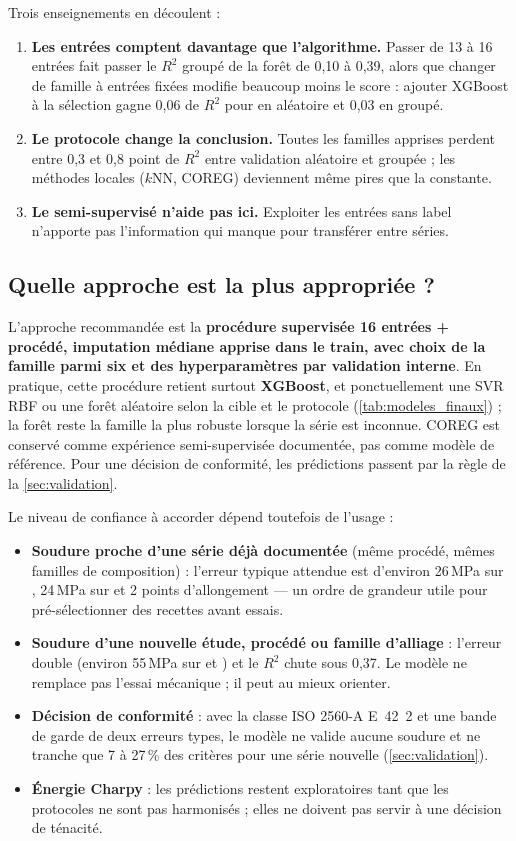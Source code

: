 Trois enseignements en découlent :
\begin{enumerate}
  \item \textbf{Les entrées comptent davantage que l'algorithme.} Passer de 13 à 16 entrées fait passer le $R^2$ groupé de la forêt de 0,10 à 0,39, alors que changer de famille à entrées fixées modifie beaucoup moins le score : ajouter XGBoost à la sélection gagne 0,06 de $R^2$ pour \YS{} en aléatoire et 0,03 en groupé.
  \item \textbf{Le protocole change la conclusion.} Toutes les familles apprises perdent entre 0,3 et 0,8 point de $R^2$ entre validation aléatoire et groupée ; les méthodes locales ($k$NN, COREG) deviennent même pires que la constante.
  \item \textbf{Le semi-supervisé n'aide pas ici.} Exploiter les entrées sans label n'apporte pas l'information qui manque pour transférer entre séries.
\end{enumerate}

\subsection{Quelle approche est la plus appropriée ?}

\begin{decision}
L'approche recommandée est la \textbf{procédure supervisée 16 entrées + procédé,
imputation médiane apprise dans le train, avec choix de la famille parmi six et
des hyperparamètres par validation interne}. En pratique, cette procédure retient
surtout \textbf{XGBoost}, et ponctuellement une SVR RBF ou une forêt aléatoire
selon la cible et le protocole (\cref{tab:modeles_finaux}) ; la forêt reste la
famille la plus robuste lorsque la série est inconnue. COREG est conservé comme
expérience semi-supervisée documentée, pas comme modèle de référence. Pour une
décision de conformité, les prédictions passent par la règle de la
\cref{sec:validation}.
\end{decision}

Le niveau de confiance à accorder dépend toutefois de l'usage :
\begin{itemize}
  \item \textbf{Soudure proche d'une série déjà documentée} (même procédé, mêmes familles de composition) : l'erreur typique attendue est d'environ 26\,MPa sur \YS, 24\,MPa sur \UTS{} et 2 points d'allongement --- un ordre de grandeur utile pour pré-sélectionner des recettes avant essais.
  \item \textbf{Soudure d'une nouvelle étude, procédé ou famille d'alliage} : l'erreur double (environ 55\,MPa sur \YS{} et \UTS) et le $R^2$ chute sous 0,37. Le modèle ne remplace pas l'essai mécanique ; il peut au mieux orienter.
  \item \textbf{Décision de conformité} : avec la classe ISO 2560-A E~42~2 et une bande de garde de deux erreurs types, le modèle ne valide aucune soudure et ne tranche que 7 à 27\,\% des critères pour une série nouvelle (\cref{sec:validation}).
  \item \textbf{Énergie Charpy} : les prédictions restent exploratoires tant que les protocoles ne sont pas harmonisés ; elles ne doivent pas servir à une décision de ténacité.
\end{itemize}

